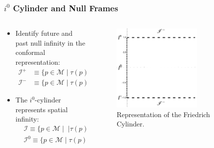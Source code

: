 \documentclass{beamer}
\theoremstyle{remark}
\theoremstyle{plain}
\theoremstyle{plain}
\begin{document}
\begin{frame}
  \frametitle{$i^0$ Cylinder and Null Frames}
  \begin{columns}
    \begin{column}{0.5\textwidth}
      \begin{itemize}
        \item Identify future and past null infinity in the conformal representation:
        \begin{align*}
          \mathscr{I}^{+} & \equiv \{ p \in \mathcal{M} \; \rvert\; \tau(p) =1\}, \\
          \mathscr{I}^{-} & \equiv \{ p \in \mathcal{M} \; \rvert \;\tau(p) =-1\}.
        \end{align*}
        \vspace{0.4cm}
        \item The $i^0$-cylinder represents spatial infinity:
        \begin{align}
          & \mathcal{I} \equiv \{ p \in \mathcal{M} \; \rvert \;\; |\tau(p)| \leq 1, \;\rho(p)=0\}, \\
          & \mathcal{I}^{0} \equiv \{ p \in \mathcal{M}\; \rvert \;\tau(p)=0, \; \rho(p)=0\}.
        \end{align}
      \end{itemize}
    \end{column}
    \begin{column}{0.5\textwidth}
      \vspace*{-6.5em} %
      \hfill
      \begin{figure}[h]
        \includegraphics[width=0.7\textwidth]{friedrich cylinder.pdf} %
        \caption{Representation of the Friedrich Cylinder.}
      \end{figure}
    \end{column}
  \end{columns}
\end{frame}
\end{document}
